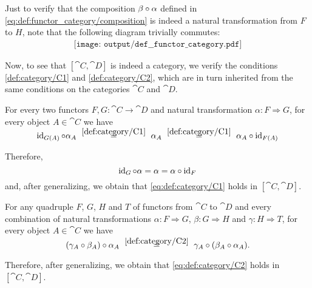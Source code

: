\begin{defproof}
  Just to verify that the composition \( \beta \bincirc \alpha \) defined in \eqref{eq:def:functor_category/composition} is indeed a natural transformation from \( F \) to \( H \), note that the following diagram trivially commutes:
  \begin{equation}\label{def:functor_category/composition}
    \begin{aligned}
      \texttt{[image: output/def\_\_functor\_category.pdf]}
    \end{aligned}
  \end{equation}

  Now, to see that \( [\cat{C}, \cat{D}] \) is indeed a category, we verify the conditions \ref{def:category/C1} and \ref{def:category/C2}, which are in turn inherited from the same conditions on the categories \( \cat{C} \) and \( \cat{D} \).

   For every two functors \( F, G: \cat{C} \to \cat{D} \) and natural transformation \( \alpha: F \Rightarrow G \), for every object \( A \in \cat{C} \) we have
  \begin{equation*}
    \id_{G(A)} \bincirc \alpha_A
    \reloset{\eqref{def:category/C1}} =
    \alpha_A
    \reloset{\eqref{def:category/C1}} =
    \alpha_A \bincirc \id_{F(A)}
  \end{equation*}

  Therefore,
  \begin{equation*}
    \id_G \bincirc \alpha = \alpha = \alpha \bincirc \id_F
  \end{equation*}
  and, after generalizing, we obtain that \eqref{eq:def:category/C1} holds in \( [\cat{C}, \cat{D}] \).

   For any quadruple \( F \), \( G \), \( H \) and \( T \) of functors from \( \cat{C} \) to \( \cat{D} \) and every combination of natural transformations \( \alpha: F \Rightarrow G \), \( \beta: G \Rightarrow H \) and \( \gamma: H \Rightarrow T \), for every object \( A \in \cat{C} \) we have
  \begin{equation*}
    (\gamma_A \bincirc \beta_A) \bincirc \alpha_A
    \reloset{\eqref{def:category/C2}} =
    \gamma_A \bincirc (\beta_A \bincirc \alpha_A).
  \end{equation*}

  Therefore, after generalizing, we obtain that \eqref{eq:def:category/C2} holds in \( [\cat{C}, \cat{D}] \).
\end{defproof}

